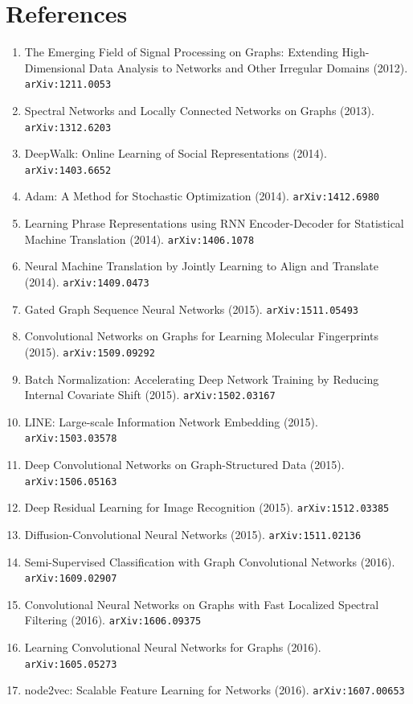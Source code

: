 \documentclass[11pt]{article}
\begin{document}
\section*{References}
\begin{enumerate}\small
  \item The Emerging Field of Signal Processing on Graphs: Extending
  High-Dimensional Data Analysis to Networks and Other Irregular Domains (2012). \texttt{arXiv:1211.0053}
  \item Spectral Networks and Locally Connected Networks on Graphs (2013). \texttt{arXiv:1312.6203}
  \item DeepWalk: Online Learning of Social Representations (2014). \texttt{arXiv:1403.6652}
  \item Adam: A Method for Stochastic Optimization (2014). \texttt{arXiv:1412.6980}
  \item Learning Phrase Representations using RNN Encoder-Decoder for
  Statistical Machine Translation (2014). \texttt{arXiv:1406.1078}
  \item Neural Machine Translation by Jointly Learning to Align and Translate (2014). \texttt{arXiv:1409.0473}
  \item Gated Graph Sequence Neural Networks (2015). \texttt{arXiv:1511.05493}
  \item Convolutional Networks on Graphs for Learning Molecular Fingerprints (2015). \texttt{arXiv:1509.09292}
  \item Batch Normalization: Accelerating Deep Network Training by Reducing
  Internal Covariate Shift (2015). \texttt{arXiv:1502.03167}
  \item LINE: Large-scale Information Network Embedding (2015). \texttt{arXiv:1503.03578}
  \item Deep Convolutional Networks on Graph-Structured Data (2015). \texttt{arXiv:1506.05163}
  \item Deep Residual Learning for Image Recognition (2015). \texttt{arXiv:1512.03385}
  \item Diffusion-Convolutional Neural Networks (2015). \texttt{arXiv:1511.02136}
  \item Semi-Supervised Classification with Graph Convolutional Networks (2016). \texttt{arXiv:1609.02907}
  \item Convolutional Neural Networks on Graphs with Fast Localized Spectral
  Filtering (2016). \texttt{arXiv:1606.09375}
  \item Learning Convolutional Neural Networks for Graphs (2016). \texttt{arXiv:1605.05273}
  \item node2vec: Scalable Feature Learning for Networks (2016). \texttt{arXiv:1607.00653}

\end{enumerate}
\end{document}
